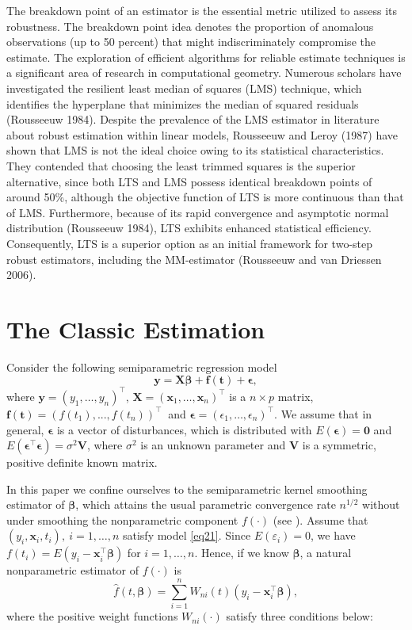 \documentclass[twoside]{article}
\begin{document}
The breakdown point of an estimator is the essential metric utilized to assess its robustness. The breakdown point idea denotes the proportion of anomalous observations (up to 50 percent) that might indiscriminately compromise the estimate. The exploration of efficient algorithms for reliable estimate techniques is a significant area of research in computational geometry. Numerous scholars have investigated the resilient least median of squares (LMS) technique, which identifies the hyperplane that minimizes the median of squared residuals (Rousseeuw 1984). Despite the prevalence of the LMS estimator in literature about robust estimation within linear models, Rousseeuw and Leroy (1987) have shown that LMS is not the ideal choice owing to its statistical characteristics. They contended that choosing the least trimmed squares is the superior alternative, since both LTS and LMS possess identical breakdown points of around 50\%, although the objective function of LTS is more continuous than that of LMS. Furthermore, because of its rapid convergence and asymptotic normal distribution (Rousseeuw 1984), LTS exhibits enhanced statistical efficiency. Consequently, LTS is a superior option as an initial framework for two-step robust estimators, including the MM-estimator (Rousseeuw and van Driessen 2006).

\section{The Classic Estimation}
Consider the following
semiparametric regression model
\begin{equation}\label{eq21}
\boldsymbol{y}=\boldsymbol{X}\boldsymbol\beta+\boldsymbol{f}(\boldsymbol t)+\boldsymbol{\epsilon},
\end{equation}
where $\boldsymbol{y} = (y_1,\ldots,y_n)^\top$, $\boldsymbol{X}=(\boldsymbol x_1,\ldots,\boldsymbol x_n)^\top$ is a $n\times p$ matrix,
$\boldsymbol{f}(\boldsymbol t)=(f(t_1),...,f(t_n))^\top~$ and
$\boldsymbol{\epsilon}=(\epsilon_1,\ldots,\epsilon_n)^\top$. We assume that in general, $\boldsymbol{\epsilon}$ is a vector of disturbances, which is distributed with $E(\boldsymbol{\epsilon})=\boldsymbol0$ and $E(\boldsymbol{\epsilon}^\top\boldsymbol{\epsilon})=\sigma^2\boldsymbol V$, where $\sigma^2$ is an unknown parameter and $\boldsymbol V$ is a symmetric, positive definite known matrix.

In this paper we confine ourselves to the semiparametric kernel smoothing
estimator of $\boldsymbol\beta$, which attains the usual parametric convergence
rate $n^{1/2}$ without under smoothing the nonparametric component
$f(\cdot)$ (see \cite{sp1988}). Assume that $(y_i,\boldsymbol x_{i},t_i),~i=1,\ldots,n$ satisfy model \eqref{eq21}. Since
$E(\varepsilon_i)=0$, we have $f(t_i)=E(y_i-\boldsymbol{x}^\top_i\boldsymbol\beta)$ for $i= 1,\ldots,n$. Hence, if we know
$\boldsymbol\beta$, a natural nonparametric estimator of $f(\cdot)$ is
\begin{equation}\label{eq22}
\hat{f}(t, \boldsymbol\beta) = \sum_{i=1}^n W_{ni}(t)(y_i -
\boldsymbol{x}^\top_i\boldsymbol\beta),
\end{equation}
where the positive weight functions $W_{ni}(\cdot)$ satisfy three
conditions below:
\end{document}
